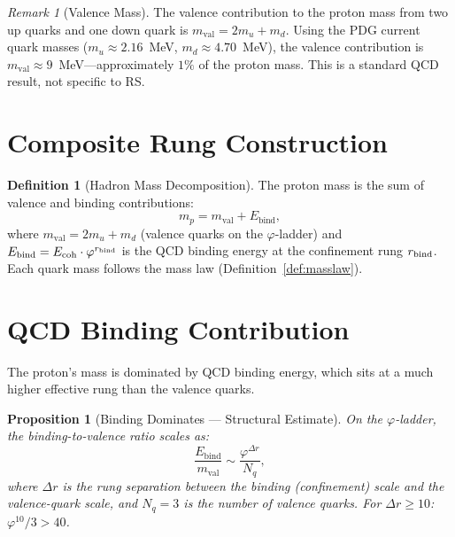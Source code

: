 \documentclass[12pt,a4paper]{article}
\newtheorem{proposition}[theorem]{Proposition}
\theoremstyle{definition}
\newtheorem{definition}[theorem]{Definition}
\theoremstyle{remark}
\newtheorem{remark}[theorem]{Remark}
\begin{document}
\begin{remark}[Valence Mass]
\label{thm:valence}
The valence contribution to the proton mass from two up quarks
and one down quark is
$m_{\mathrm{val}} = 2m_u + m_d$.
Using the PDG current quark masses ($m_u \approx 2.16$~MeV,
$m_d \approx 4.70$~MeV), the valence contribution is
$m_{\mathrm{val}} \approx 9$~MeV---approximately $1\%$ of the
proton mass.  This is a standard QCD result, not specific to RS.
\end{remark}

\section{Composite Rung Construction}
\label{sec:composite}

\begin{definition}[Hadron Mass Decomposition]
\label{def:composite}
The proton mass is the sum of valence and binding contributions:
\begin{equation}
  m_p = m_{\mathrm{val}} + E_{\mathrm{bind}},
\end{equation}
where $m_{\mathrm{val}} = 2m_u + m_d$ (valence quarks on
the $\varphi$-ladder) and $E_{\mathrm{bind}} =
E_{\rm coh} \cdot \varphi^{r_{\rm bind}}$ is the QCD
binding energy at the confinement rung $r_{\rm bind}$.
Each quark mass follows the mass law
(Definition~\ref{def:masslaw}).
\end{definition}

\section{QCD Binding Contribution}
\label{sec:binding}

The proton's mass is dominated by QCD binding energy, which
sits at a much higher effective rung than the valence quarks.

\begin{proposition}[Binding Dominates --- Structural Estimate]
\label{thm:dominates}
On the $\varphi$-ladder, the binding-to-valence ratio scales as:
\begin{equation}
  \frac{E_{\mathrm{bind}}}{m_{\mathrm{val}}}
  \sim \frac{\varphi^{\Delta r}}{N_q},
\end{equation}
where $\Delta r$ is the rung separation between the binding
(confinement) scale and the valence-quark scale, and $N_q = 3$ is
the number of valence quarks.  For $\Delta r \geq 10$:
$\varphi^{10}/3 > 40$.
\end{proposition}
\end{document}
